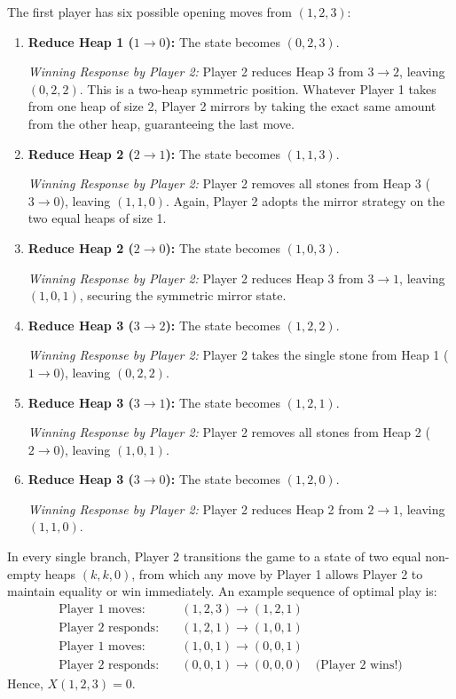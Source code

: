 ﻿\documentclass[a4paper]{article}
\begin{document}
The first player has six possible opening moves from $(1, 2, 3)$:
\begin{enumerate}[label=\arabic*.]
    \item \textbf{Reduce Heap 1 ($1 \to 0$):} The state becomes $(0, 2, 3)$. 
    
    \textit{Winning Response by Player 2:} Player 2 reduces Heap 3 from $3 \to 2$, leaving $(0, 2, 2)$. This is a two-heap symmetric position. Whatever Player 1 takes from one heap of size 2, Player 2 mirrors by taking the exact same amount from the other heap, guaranteeing the last move.
    
    \item \textbf{Reduce Heap 2 ($2 \to 1$):} The state becomes $(1, 1, 3)$.
    
    \textit{Winning Response by Player 2:} Player 2 removes all stones from Heap 3 ($3 \to 0$), leaving $(1, 1, 0)$. Again, Player 2 adopts the mirror strategy on the two equal heaps of size 1.
    
    \item \textbf{Reduce Heap 2 ($2 \to 0$):} The state becomes $(1, 0, 3)$.
    
    \textit{Winning Response by Player 2:} Player 2 reduces Heap 3 from $3 \to 1$, leaving $(1, 0, 1)$, securing the symmetric mirror state.
    
    \item \textbf{Reduce Heap 3 ($3 \to 2$):} The state becomes $(1, 2, 2)$.
    
    \textit{Winning Response by Player 2:} Player 2 takes the single stone from Heap 1 ($1 \to 0$), leaving $(0, 2, 2)$.
    
    \item \textbf{Reduce Heap 3 ($3 \to 1$):} The state becomes $(1, 2, 1)$.
    
    \textit{Winning Response by Player 2:} Player 2 removes all stones from Heap 2 ($2 \to 0$), leaving $(1, 0, 1)$.
    
    \item \textbf{Reduce Heap 3 ($3 \to 0$):} The state becomes $(1, 2, 0)$.
    
    \textit{Winning Response by Player 2:} Player 2 reduces Heap 2 from $2 \to 1$, leaving $(1, 1, 0)$.
\end{enumerate}

In every single branch, Player 2 transitions the game to a state of two equal non-empty heaps $(k, k, 0)$, from which any move by Player 1 allows Player 2 to maintain equality or win immediately. An example sequence of optimal play is:
\begin{align*}
\text{Player 1 moves:} \quad &(1, 2, 3) \longrightarrow (1, 2, 1) \\
\text{Player 2 responds:} \quad &(1, 2, 1) \longrightarrow (1, 0, 1) \\
\text{Player 1 moves:} \quad &(1, 0, 1) \longrightarrow (0, 0, 1) \\
\text{Player 2 responds:} \quad &(0, 0, 1) \longrightarrow (0, 0, 0) \quad \text{(Player 2 wins!)}
\end{align*}
Hence, $X(1, 2, 3) = 0$.
\end{document}
